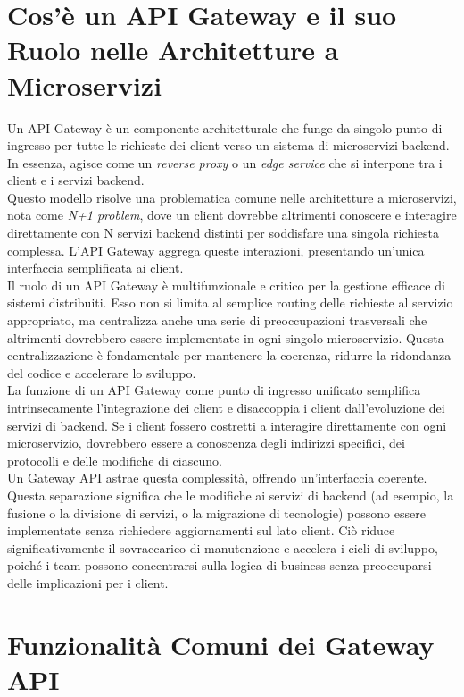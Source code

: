 \section{Cos'è un API Gateway e il suo Ruolo nelle Architetture a Microservizi}

Un API Gateway è un componente architetturale che funge da singolo punto di ingresso per tutte le richieste dei client verso un sistema di microservizi backend.
In essenza, agisce come un \textit{reverse proxy} o un \textit{edge service} che si interpone tra i client e i servizi backend. \\
Questo modello risolve una problematica comune nelle architetture a microservizi, nota come \textit{N+1 problem}, dove un client dovrebbe altrimenti conoscere e interagire direttamente con N servizi backend distinti per soddisfare una singola richiesta complessa. 
L'API Gateway aggrega queste interazioni, presentando un'unica interfaccia semplificata ai client. \\

Il ruolo di un API Gateway è multifunzionale e critico per la gestione efficace di sistemi distribuiti.
Esso non si limita al semplice routing delle richieste al servizio appropriato, ma centralizza anche una serie di preoccupazioni trasversali che altrimenti dovrebbero essere implementate in ogni singolo microservizio.
Questa centralizzazione è fondamentale per mantenere la coerenza, ridurre la ridondanza del codice e accelerare lo sviluppo. \\

La funzione di un API Gateway come punto di ingresso unificato semplifica intrinsecamente l'integrazione dei client e disaccoppia i client dall'evoluzione dei servizi di backend.
Se i client fossero costretti a interagire direttamente con ogni microservizio, dovrebbero essere a conoscenza degli indirizzi specifici, dei protocolli e delle modifiche di ciascuno. \\
Un Gateway API astrae questa complessità, offrendo un'interfaccia coerente. Questa separazione significa che le modifiche ai servizi di backend (ad esempio, la fusione o la divisione di servizi, o la migrazione di tecnologie) possono essere implementate senza richiedere aggiornamenti sul lato client.
Ciò riduce significativamente il sovraccarico di manutenzione e accelera i cicli di sviluppo, poiché i team possono concentrarsi sulla logica di business senza preoccuparsi delle implicazioni per i client.

\section{Funzionalità Comuni dei Gateway API}

